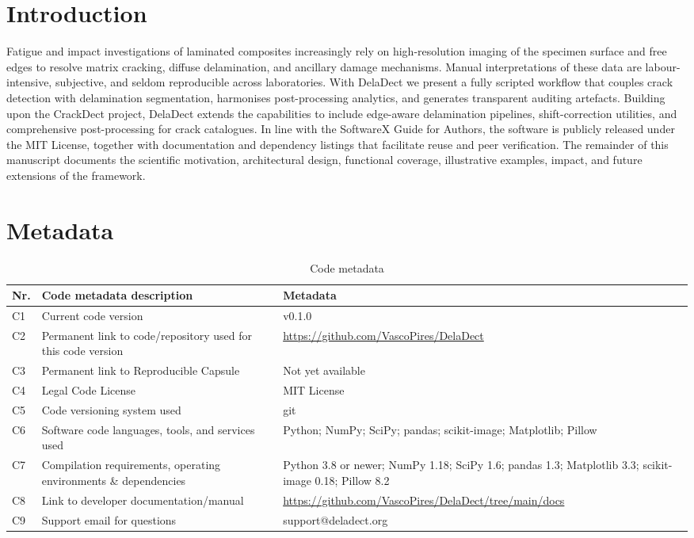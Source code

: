 \documentclass[preprint,12pt,a4paper]{elsarticle}
\begin{document}
\section{Introduction}
Fatigue and impact investigations of laminated composites increasingly rely on high-resolution imaging
of the specimen surface and free edges to resolve matrix cracking, diffuse delamination, and ancillary
damage mechanisms. Manual interpretations of these data are labour-intensive, subjective, and seldom
reproducible across laboratories. With DelaDect we present a fully scripted workflow that couples crack
detection with delamination segmentation, harmonises post-processing analytics, and generates transparent
auditing artefacts. Building upon the CrackDect project\cite{scikit-image}, DelaDect extends the
capabilities to include edge-aware delamination pipelines, shift-correction utilities, and
comprehensive post-processing for crack catalogues. In line with the SoftwareX Guide for Authors, the
software is publicly released under the MIT License, together with documentation and dependency listings
that facilitate reuse and peer verification. The remainder of this manuscript documents the scientific
motivation, architectural design, functional coverage, illustrative examples, impact, and future
extensions of the framework.

\section*{Metadata}
\label{sec:metadata}

\begin{table}[!h]
\begin{tabular}{|l|p{6.5cm}|p{6.5cm}|}
\hline
\textbf{Nr.} & \textbf{Code metadata description} & \textbf{Metadata} \\
\hline
C1 & Current code version & v0.1.0 \\
\hline
C2 & Permanent link to code/repository used for this code version & \url{https://github.com/VascoPires/DelaDect} \\
\hline
C3 & Permanent link to Reproducible Capsule & Not yet available \\
\hline
C4 & Legal Code License & MIT License \\
\hline
C5 & Code versioning system used & git \\
\hline
C6 & Software code languages, tools, and services used & Python; NumPy; SciPy; pandas; scikit-image; Matplotlib; Pillow \\
\hline
C7 & Compilation requirements, operating environments \& dependencies & Python 3.8 or newer; NumPy 1.18; SciPy 1.6; pandas 1.3; Matplotlib 3.3; scikit-image 0.18; Pillow 8.2 \\
\hline
C8 & Link to developer documentation/manual & \url{https://github.com/VascoPires/DelaDect/tree/main/docs} \\
\hline
C9 & Support email for questions & support@deladect.org \\
\hline
\end{tabular}
\caption{Code metadata}
\label{codeMetadata}
\end{table}
\end{document}
